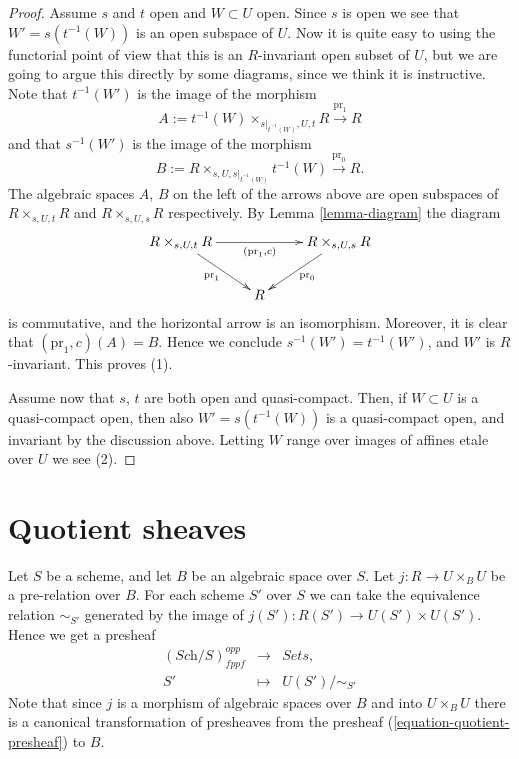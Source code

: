 \begin{proof}
Assume $s$ and $t$ open and $W \subset U$ open.
Since $s$ is open we see that $W' = s(t^{-1}(W))$ is an open subspace of $U$.
Now it is quite easy to using the functorial point of view
that this is an $R$-invariant open subset of $U$, but we are going to argue
this directly by some diagrams, since we think it is instructive.
Note that $t^{-1}(W')$ is the image of the morphism
$$
A := t^{-1}(W) \times_{s|_{t^{-1}(W)}, U, t} R
\xrightarrow{\text{pr}_1} R
$$
and that $s^{-1}(W')$ is the image of the morphism
$$
B := R \times_{s, U, s|_{t^{-1}(W)}} t^{-1}(W)
\xrightarrow{\text{pr}_0} R.
$$
The algebraic spaces $A$, $B$
on the left of the arrows above are open subspaces of
$R \times_{s, U, t} R$ and $R \times_{s, U, s} R$ respectively.
By Lemma \ref{lemma-diagram} the diagram
$$
\xymatrix{
R \times_{s, U, t} R \ar[rd]_{\text{pr}_1} \ar[rr]_{(\text{pr}_1, c)} & &
R \times_{s, U, s} R \ar[ld]^{\text{pr}_0} \\
& R &
}
$$
is commutative, and the horizontal arrow is an isomorphism. Moreover, it is
clear that $(\text{pr}_1, c)(A) = B$. Hence we conclude
$s^{-1}(W') = t^{-1}(W')$, and $W'$ is $R$-invariant. This proves (1).

\medskip\noindent
Assume now that $s$, $t$ are both open and quasi-compact.
Then, if $W \subset U$ is a quasi-compact open, then also
$W' = s(t^{-1}(W))$ is a quasi-compact open, and invariant by the
discussion above. Letting $W$ range over images of affines etale over $U$
we see (2).
\end{proof}





\section{Quotient sheaves}
\label{section-quotient-sheaves}

\noindent
Let $S$ be a scheme, and let $B$ be an algebraic space over $S$.
Let $j : R \to U \times_B U$ be a pre-relation over $B$.
For each scheme $S'$ over $S$ we can take the equivalence relation
$\sim_{S'}$ generated by the image of $j(S') : R(S') \to U(S') \times U(S')$.
Hence we get a presheaf
\begin{equation}
\label{equation-quotient-presheaf}
\begin{matrix}
(\textit{Sch}/S)^{opp}_{fppf} &
\longrightarrow &
\textit{Sets}, \\
S' &
\longmapsto  &
U(S')/\sim_{S'}
\end{matrix}
\end{equation}
Note that since $j$ is a morphism of algebraic spaces over $B$
and into $U \times_B U$ there is a canonical transformation of
presheaves from the presheaf (\ref{equation-quotient-presheaf}) to $B$. 

